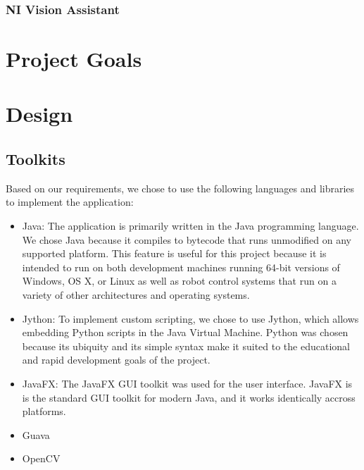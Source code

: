 \documentclass[12pt]{article}
\begin{document}
\subsubsection{NI Vision Assistant}


\section{Project Goals}


\section{Design}



\subsection{Toolkits}
Based on our requirements, we chose to use the following languages and libraries to implement the application:
\begin{itemize}
	\item Java: The application is primarily written in the Java programming language.  We chose Java because it compiles to bytecode that runs unmodified on any supported platform.  This feature is useful for this project because it is intended to run on both development machines running 64-bit versions of Windows, OS X, or Linux as well as robot control systems that run on a variety of other architectures and operating systems.
    \item Jython: To implement custom scripting, we chose to use Jython, which allows embedding Python scripts in the Java Virtual Machine.  Python was chosen because its ubiquity and its simple syntax make it suited to the educational and rapid development goals of the project.
    \item JavaFX: The JavaFX GUI toolkit was used for the user interface.  JavaFX is is the standard GUI toolkit for modern Java, and it works identically accross platforms.
    \item Guava
    \item OpenCV
\end{itemize}
\end{document}
